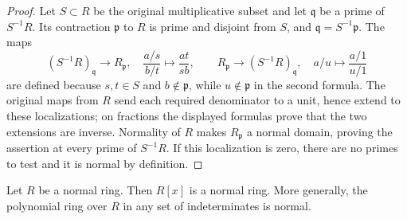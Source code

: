 \begin{proof}
Let $S\subset R$ be the original multiplicative subset and
let $\mathfrak q$ be a prime of $S^{-1}R$. Its contraction
$\mathfrak p$ to $R$ is prime and disjoint from $S$, and
$\mathfrak q=S^{-1}\mathfrak p$. The maps
$$
(S^{-1}R)_{\mathfrak q}\longrightarrow R_{\mathfrak p},
\quad\frac{a/s}{b/t}\longmapsto\frac{at}{sb},
\qquad
R_{\mathfrak p}\longrightarrow(S^{-1}R)_{\mathfrak q},
\quad a/u\longmapsto\frac{a/1}{u/1}
$$
are defined because $s,t\in S$ and $b\notin\mathfrak p$,
while $u\notin\mathfrak p$ in the second formula. The original
maps from $R$ send each required denominator to a unit, hence
extend to these localizations; on fractions the displayed formulas
prove that the two extensions are inverse. Normality of $R$
makes $R_{\mathfrak p}$ a normal domain, proving the assertion
at every prime of $S^{-1}R$. If this localization is zero,
there are no primes to test and it is normal by definition.
\end{proof}

\begin{lemma}
\label{lemma-polynomial-ring-normal}
Let $R$ be a normal ring. Then $R[x]$ is a normal ring.
More generally, the polynomial ring over $R$ in any set of
indeterminates is normal.
\end{lemma}

